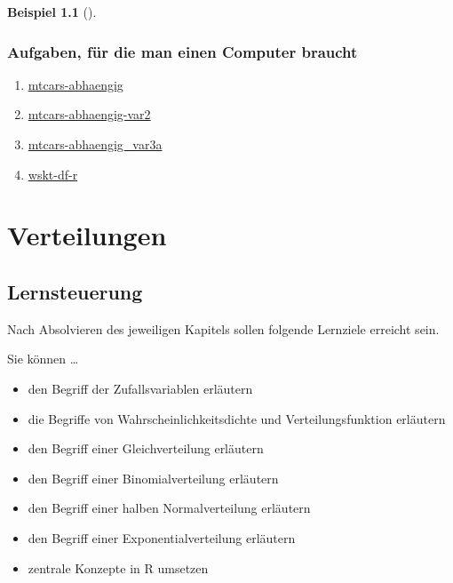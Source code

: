 \documentclass[
  ngerman,
  letterpaper,
  twoside,
  open=any]{scrbook}
\providecommand{\tightlist}{%
  \setlength{\itemsep}{0pt}\setlength{\parskip}{0pt}}\usepackage{longtable,booktabs,array}
\theoremstyle{definition}
\newtheorem{example}{Beispiel}[chapter]
\theoremstyle{plain}
\theoremstyle{definition}
\theoremstyle{definition}
\theoremstyle{remark}
\begin{document}
\begin{example}[]
\subsection{Aufgaben, für die man einen Computer
braucht}\label{aufgaben-fuxfcr-die-man-einen-computer-braucht-2}

\begin{enumerate}
\def\labelenumi{\arabic{enumi}.}
\tightlist
\item
  \href{https://datenwerk.netlify.app/posts/mtcars-abhaengig/mtcars-abhaengig.html}{mtcars-abhaengig}
\item
  \href{https://datenwerk.netlify.app/posts/mtcars-abhaengig_var2/mtcars-abhaengig_var2}{mtcars-abhaengig-var2}
\item
  \href{https://datenwerk.netlify.app/posts/mtcars-abhaengig_var3a/mtcars-abhaengig_var3a}{mtcars-abhaengig\_var3a}
\item
  \href{https://datenwerk.netlify.app/posts/wskt-df-r/wskt-df-r}{wskt-df-r}
\end{enumerate}

\chapter{Verteilungen}\label{verteilungen}

\section{Lernsteuerung}\label{lernsteuerung-4}

Nach Absolvieren des jeweiligen Kapitels sollen folgende Lernziele
erreicht sein.

Sie können \ldots{}

\begin{itemize}
\tightlist
\item
  den Begriff der Zufallsvariablen erläutern
\item
  die Begriffe von Wahrscheinlichkeitsdichte und Verteilungsfunktion
  erläutern
\item
  den Begriff einer Gleichverteilung erläutern
\item
  den Begriff einer Binomialverteilung erläutern
\item
  den Begriff einer halben Normalverteilung erläutern
\item
  den Begriff einer Exponentialverteilung erläutern
\item
  zentrale Konzepte in R umsetzen
\end{itemize}


\end{example}
\end{document}

